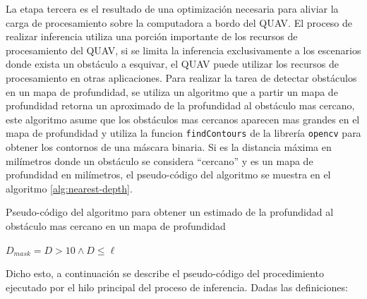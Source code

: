 La etapa tercera es el resultado de una optimización necesaria para aliviar la carga de procesamiento sobre la computadora a bordo del QUAV. El proceso de realizar inferencia utiliza una porción importante de los recursos de procesamiento del QUAV, si se limita la inferencia exclusivamente a los escenarios donde exista un obstáculo a esquivar, el QUAV puede utilizar los recursos de procesamiento en otras aplicaciones. Para realizar la tarea de detectar obstáculos en un mapa de profundidad, se utiliza un algoritmo que a partir un mapa de profundidad retorna un aproximado de la profundidad al obstáculo mas cercano, este algoritmo asume que los obstáculos mas cercanos aparecen mas grandes en el mapa de profundidad y utiliza la funcion \texttt{findContours} de la librería \texttt{opencv} \cite{bradski2000opencv} para obtener los contornos de una máscara binaria. Si \jim{\ell} es la distancia máxima en milímetros donde un obstáculo se considera ``cercano'' y  es un mapa de profundidad en milímetros, el pseudo-código del algoritmo se muestra en el algoritmo \ref{alg:nearest-depth}.

\begin{algorithm}
\caption{Pseudo-código del algoritmo para obtener un estimado de la profundidad al obstáculo mas cercano en un mapa de profundidad }
\label{alg:nearest-depth}

$D_{mask} = D > 10 \wedge D \leq \ell$


\Return{\jim{\infty}}

\end{algorithm}

Dicho esto, a continuación se describe el pseudo-código del procedimiento ejecutado por el hilo principal del proceso de inferencia. Dadas las definiciones:

